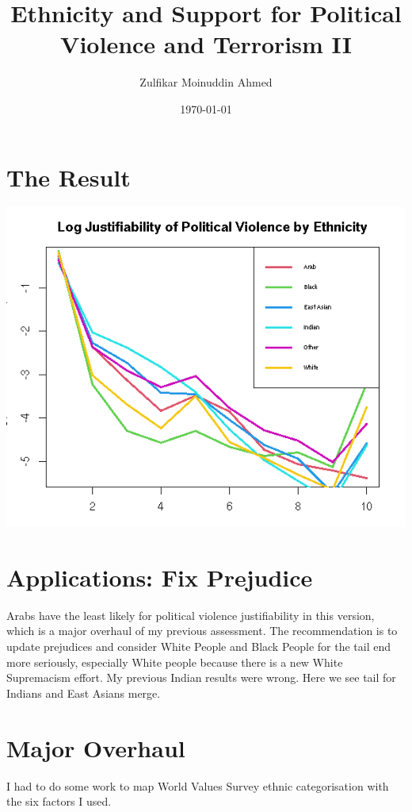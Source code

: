 \documentclass{amsart}
\title{Ethnicity and Support for Political Violence and Terrorism II}
\author{Zulfikar Moinuddin Ahmed}
\date{\today}
\begin{document}
\maketitle

\section{The Result}

\includegraphics[scale=0.8]{ethterror.jpeg}

\section{Applications: Fix Prejudice}

Arabs have the least likely for political violence justifiability in this version, which is a major overhaul of my previous assessment.  The recommendation is to update prejudices and consider White People and Black People for the tail end more seriously, especially White people because there is a new White Supremacism effort. My previous Indian results were wrong.  Here we see tail for Indians and East Asians merge.  

\section{Major Overhaul}

I had to do some work to map World Values Survey ethnic categorisation with the six factors I used.  
\end{document}
